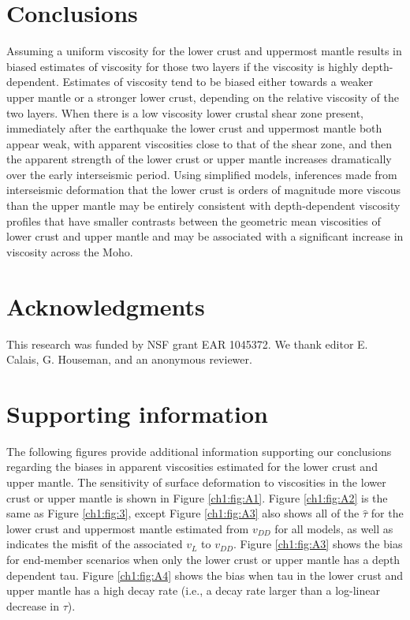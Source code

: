 \section{Conclusions}
Assuming a uniform viscosity for the lower crust and uppermost mantle
results in biased estimates of viscosity for those two layers if the
viscosity is highly depth-dependent.  Estimates of viscosity tend to
be biased either towards a weaker upper mantle or a stronger lower
crust, depending on the relative viscosity of the two layers.  When
there is a low viscosity lower crustal shear zone present, immediately
after the earthquake the lower crust and uppermost mantle both appear
weak, with apparent viscosities close to that of the shear zone, and
then the apparent strength of the lower crust or upper mantle
increases dramatically over the early interseismic period.  Using
simplified models, inferences made from interseismic deformation that
the lower crust is orders of magnitude more viscous than the upper
mantle may be entirely consistent with depth-dependent viscosity
profiles that have smaller contrasts between the geometric mean
viscosities of lower crust and upper mantle and may be associated with
a significant increase in viscosity across the Moho.

\section{Acknowledgments}
This research was funded by NSF grant EAR 1045372. We thank editor E.
Calais, G. Houseman, and an anonymous reviewer.

%
%

\section{Supporting information}
The following figures provide additional information supporting our
conclusions regarding the biases in apparent viscosities estimated for
the lower crust and upper mantle. The sensitivity of surface
deformation to viscosities in the lower crust or upper mantle is shown
in Figure \ref{ch1:fig:A1}.  Figure \ref{ch1:fig:A2} is the same as
Figure \ref{ch1:fig:3}, except Figure \ref{ch1:fig:A3} also shows all
of the $\hat{\tau}$ for the lower crust and uppermost mantle estimated
from $v_{DD}$ for all models, as well as indicates the misfit of the
associated $v_L$ to $v_{DD}$. Figure \ref{ch1:fig:A3} shows the bias
for end-member scenarios when only the lower crust or upper mantle has
a depth dependent tau. Figure \ref{ch1:fig:A4} shows the bias when tau
in the lower crust and upper mantle has a high decay rate (i.e., a
decay rate larger than a log-linear decrease in $\tau$).


